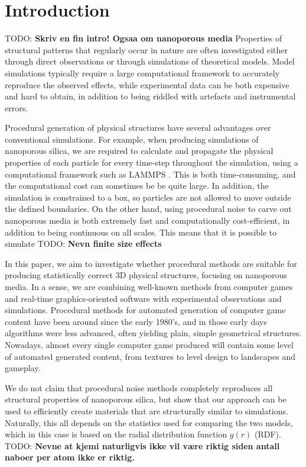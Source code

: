 \documentclass[aps,pre,twocolumn,letterpaper,floatfix,showpacs]{revtex4}
\newcommand{\todo}[1]{ {\color{Magenta} TODO: \color{Blue} \textbf{#1} }}
\begin{document}
\section{Introduction}

\todo{Skriv en fin intro! Ogsaa om nanoporous media}
Properties of structural patterns that regularly occur in nature are often investigated either through direct observations or through simulations of theoretical models. Model simulations typically require a large computational framework to accurately reproduce the observed effects, while experimental data can be both expensive and hard to obtain, in addition to being riddled with artefacts and instrumental errors.   

Procedural generation of physical structures have several advantages over conventional simulations. For example, when producing simulations of nanoporous silica, we are required to calculate and propagate the physical properties of each particle for every time-step throughout the simulation, using a computational framework such as LAMMPS \cite{plimpton1995fast}. This is both time-consuming, and the computational cost can sometimes be be quite large. In addition, the simulation is constrained to a box, so particles are not allowed to move outside the defined boundaries. On the other hand, using procedural noise to carve out nanoporous media is both extremely fast and computationally cost-efficient, in addition to being continuous on all scales. This means that it is possible to simulate 
\todo{Nevn finite size effects}

In this paper, we aim to investigate whether procedural methods are suitable for producing statistically correct 3D physical structures, focusing on nanoporous media. In a sense, we are combining well-known methods from computer games and real-time graphics-oriented software with experimental observations and simulations. Procedural methods for automated generation of computer game content have been around since the early 1980's, and in those early days algorithms were less advanced, often yielding plain, simple geometrical structures. Nowadays, almost every single computer game produced will contain some level of automated generated content, from textures to level design to landscapes and gameplay. 

We do not claim that procedural noise methods completely reproduces all structural properties of nanoporous silica, but show that our approach can be used to efficiently create materials that are structurally similar to simulations. Naturally, this all depends on the statistics used for comparing the two models, which in this case is based on the radial distribution function $g(r)$ (RDF). 
\todo{Nevne at kjemi naturligvis ikke vil være riktig siden antall naboer per atom ikke er riktig. }
\end{document}
